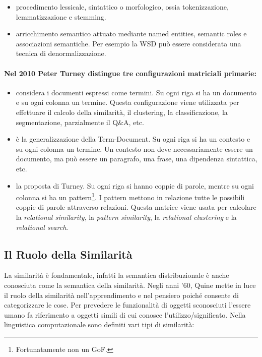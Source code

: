 \begin{itemize}
  \item {} procedimento lessicale, sintattico o morfologico, ossia tokenizzazione, lemmatizzazione e stemming. 
  \item {} arricchimento semantico attuato mediante named entities, semantic roles e associazioni semantiche. Per esempio la WSD può essere considerata una tecnica di denormalizzazione.
\end{itemize}

\paragraph{Nel 2010 Peter Turney distingue tre configurazioni matriciali primarie:}

\begin{itemize}
  \item {} considera i documenti espressi come termini. Su ogni riga si ha un documento e su ogni colonna un termine. Questa configurazione viene utilizzata per effettuare il calcolo della similarità, il clustering, la classificazione, la segmentazione, parzialmente il Q\&A, etc.
  \item {} è la generalizzazione della Term-Document. Su ogni riga si ha un contesto e su ogni colonna un termine. Un contesto non deve necessariamente essere un documento, ma può essere un paragrafo, una frase, una dipendenza sintattica, etc. 
  \item {} la proposta di Turney. Su ogni riga si hanno coppie di parole, mentre su ogni colonna si ha un pattern\footnote{Fortunatamente non un GoF.}. I pattern mettono in relazione tutte le possibili coppie di parole attraverso relazioni. Questa matrice viene usata per calcolare la \textit{relational similarity}, la \textit{pattern similarity}, la \textit{relational clustering} e la \textit{relational search}. 
\end{itemize}

\subsection{Il Ruolo della Similarità}

La similarità è fondamentale, infatti la semantica distribuzionale è anche conosciuta come la semantica della similarità. Negli anni '60, Quine mette in luce il ruolo della similarità nell'apprendimento e nel pensiero poiché consente di categorizzare le cose. Per prevedere le funzionalità di oggetti sconosciuti l'essere umano fa riferimento a oggetti simili di cui conosce l'utilizzo/significato. Nella linguistica computazionale sono definiti vari tipi di similarità:

